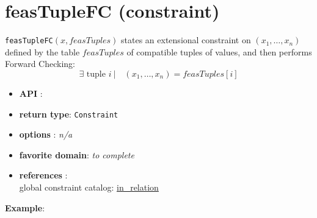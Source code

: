 \label{feastuplefc}
\hypertarget{feastuplefc}{}

\section{feasTupleFC (constraint)}\label{feastuplefc:feastuplefcconstraint}\hypertarget{feastuplefc:feastuplefcconstraint}{}
\begin{notedef}
  \texttt{feasTupleFC}$(x,feasTuples)$ states an extensional constraint on $(x_1,\ldots,x_n)$ defined by the table $feasTuples$ of compatible tuples of values, and then performs Forward Checking:
      $$\exists \text{ tuple } i\ |\quad (x_1,\ldots,x_n)=feasTuples[i]$$
\end{notedef}


\begin{itemize}
	\item \textbf{API} : 
	\item \textbf{return type}: \texttt{Constraint}
	\item \textbf{options} : \emph{n/a}
	\item \textbf{favorite domain}: \emph{to complete}
	\item \textbf{references} :\\
      global constraint catalog: \href{http://www.emn.fr/x-info/sdemasse/gccat/Cin_relation.html}{in\_relation}
\end{itemize}

\textbf{Example}:

